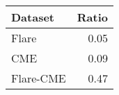 \begin{tabular}{lr}
\toprule
Dataset & Ratio \\
\midrule
Flare & 0.05 \\
CME & 0.09 \\
Flare-CME & 0.47 \\
\bottomrule
\end{tabular}
